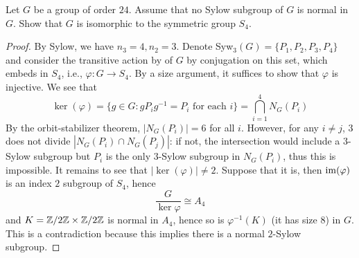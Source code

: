 \begin{prob}[F2018-Q2]
    Let \( G \) be a group of order \( 24 \). Assume that no Sylow subgroup of \( G \) is normal in \( G \). Show that \( G \) is isomorphic to the symmetric group \( S_4 \).
\end{prob}
\begin{proof}
    By Sylow, we have $n_3=4, n_2=3$. Denote Syw$_3(G)=\{P_1,P_2,P_3,P_4\}$ and consider the transitive action by of $G$ by conjugation on this set, which embeds in $S_4$, i.e., $\varphi: G\to S_4$. By a size argument, it suffices to show that $\varphi$ is injective. We see that 
    \begin{equation*}
        \ker(\varphi)=\{g\in G: gP_ig^{-1}=P_i \text{ for each }i\}=\bigcap_{i=1}^4N_G(P_i)
    \end{equation*}
    By the orbit-stabilizer theorem, $|N_G(P_i)|=6$ for all $i$. However, for any $i\neq j$, $3$ does not divide $|N_G(P_i)\cap N_G(P_j)|$: if not, the intersection would include a $3$-Sylow subgroup but $P_i$ is the only $3$-Sylow subgroup in $N_G(P_i)$, thus this is impossible. It remains to see that $|\ker(\varphi)|\neq 2$. Suppose that it is, then $\operatorname{im}(\varphi)$ is an index $2$ subgroup of $S_4$, hence 
    \begin{equation*}
        \frac{G}{\ker\varphi}\cong A_4
    \end{equation*}
    and $K=\mathbb{Z}/2\mathbb{Z}\times\mathbb{Z}/2\mathbb{Z}$ is normal in $A_4$, hence so is $\varphi^{-1}(K)$ (it has size $8$) in $G$. This is a contradiction because this implies there is a normal $2$-Sylow subgroup.
\end{proof}


